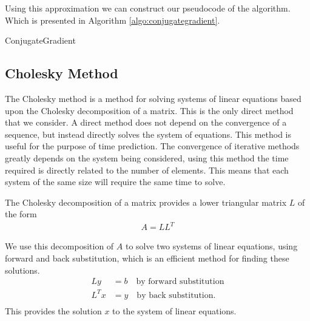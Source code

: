 \documentclass[../fem.tex]{subfiles}
\begin{document}
Using this approximation we can construct our pseudocode of the algorithm. Which
is presented in Algorithm \ref{algo:conjugategradient}.

\begin{algorithm}[H]
  \caption{ConjugateGradient}\label{algo:conjugategradient}
  \begin{algorithmic}
    \Else
    \EndIf
    \EndIf
    \EndFor
  \end{algorithmic}
\end{algorithm}

\subsection{Cholesky Method}%
\label{sub:cholesky_method}

The Cholesky method is a method for solving systems of linear equations based
upon the Cholesky decomposition of a matrix. This is the only direct method
that we consider. A direct method does not depend on the convergence of a sequence,
but instead directly solves the system of equations. This method is useful for
the purpose of time prediction. The convergence of iterative methods greatly
depends on the system being considered, using this method the time required is
directly related to the number of elements. This means that each system of the
same size will require the same time to solve.

\begin{Figure}
   \begin{center}
     
   \end{center}
   \label{fig:ch_time}
\end{Figure}

The Cholesky decomposition of a matrix provides a lower triangular matrix $L$
of the form
\begin{align*}
   A=LL^T
\end{align*}

We use this decomposition of $A$ to solve two systems of linear equations,
using forward and back substitution, which is an efficient method for finding
these solutions.
\begin{align*}
  Ly&=b\quad\text{by forward substitution}\\
  L^Tx&=y\quad\text{by back substitution}.\\
\end{align*}
This provides the solution $x$ to the system of linear equations.
\end{document}
